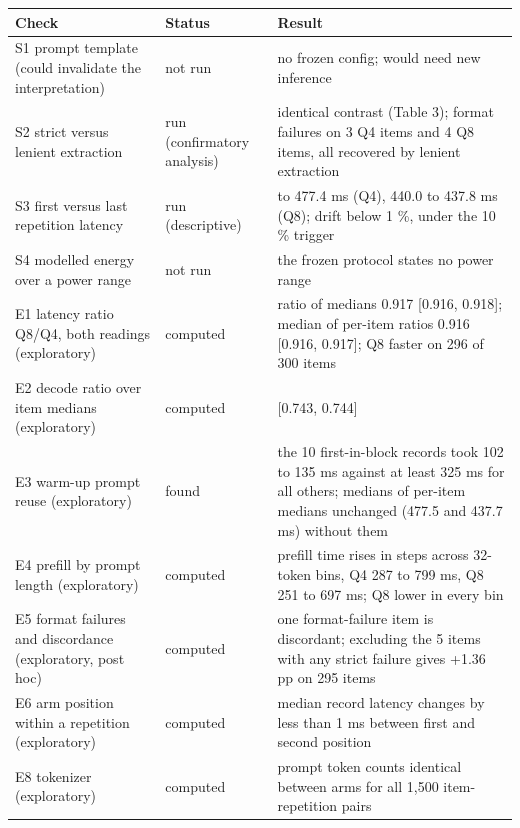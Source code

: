 \documentclass[
]{article}
\begin{document}
\begin{longtable}[]{@{}
  >{\raggedright\arraybackslash}p{}
  >{\raggedright\arraybackslash}p{}
  >{\raggedright\arraybackslash}p{}@{}}
\toprule\noalign{}
\begin{minipage}[b]{\linewidth}\raggedright
Check
\end{minipage} & \begin{minipage}[b]{\linewidth}\raggedright
Status
\end{minipage} & \begin{minipage}[b]{\linewidth}\raggedright
Result
\end{minipage} \\
\midrule\noalign{}
\endhead
\bottomrule\noalign{}
\endlastfoot
S1 prompt template (could invalidate the interpretation) & not run & no
frozen config; would need new inference \\
S2 strict versus lenient extraction & run (confirmatory analysis) &
identical contrast (Table 3); format failures on 3 Q4 items and 4 Q8
items, all recovered by lenient extraction \\
S3 first versus last repetition latency & run (descriptive) & 478.1 to
477.4 ms (Q4), 440.0 to 437.8 ms (Q8); drift below 1 \%, under the 10 \%
trigger \\
S4 modelled energy over a power range & not run & the frozen protocol
states no power range \\
E1 latency ratio Q8/Q4, both readings (exploratory) & computed & ratio
of medians 0.917 {[}0.916, 0.918{]}; median of per-item ratios 0.916
{[}0.916, 0.917{]}; Q8 faster on 296 of 300 items \\
E2 decode ratio over item medians (exploratory) & computed & 0.744
{[}0.743, 0.744{]} \\
E3 warm-up prompt reuse (exploratory) & found & the 10 first-in-block
records took 102 to 135 ms against at least 325 ms for all others;
medians of per-item medians unchanged (477.5 and 437.7 ms) without
them \\
E4 prefill by prompt length (exploratory) & computed & prefill time
rises in steps across 32-token bins, Q4 287 to 799 ms, Q8 251 to 697 ms;
Q8 lower in every bin \\
E5 format failures and discordance (exploratory, post hoc) & computed &
one format-failure item is discordant; excluding the 5 items with any
strict failure gives +1.36 pp on 295 items \\
E6 arm position within a repetition (exploratory) & computed & median
record latency changes by less than 1 ms between first and second
position \\
E8 tokenizer (exploratory) & computed & prompt token counts identical
between arms for all 1,500 item-repetition pairs \\
\end{longtable}
\end{document}
